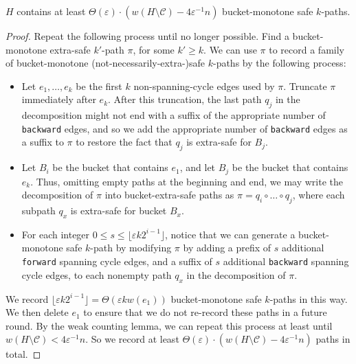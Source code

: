 \documentclass{theoretics}
\newcommand{\eps}{\varepsilon}
\newcommand{\cee}{\mathcal{C}}
\newcommand{\forward}{\texttt{forward}}
\newcommand{\backward}{\texttt{backward}}
\begin{document}
\begin{lemma} 
$H$ contains at least $\Theta(\eps) \cdot \left( w(H \setminus \cee) - 4 \eps^{-1} n \right)$ bucket-monotone safe $k$-paths.
\end{lemma}
\begin{proof}
Repeat the following process until no longer possible.
Find a bucket-monotone extra-safe $k'$-path $\pi$, for some $k' \ge k$.
We can use $\pi$ to record a family of bucket-monotone (not-necessarily-extra-)safe $k$-paths by the following process:
\begin{itemize}
\item Let $e_1, \dots, e_k$ be the first $k$ non-spanning-cycle edges used by $\pi$.
Truncate $\pi$ immediately after $e_k$.
After this truncation, the last path $q_j$ in the decomposition might not end with a suffix of the appropriate number of \backward{} edges, and so we add the appropriate number of \backward{} edges as a suffix to $\pi$ to restore the fact that $q_j$ is extra-safe for $B_j$.

\item Let $B_i$ be the bucket that contains $e_1$, and let $B_j$ be the bucket that contains $e_k$.
Thus, omitting empty paths at the beginning and end, we may write the decomposition of $\pi$ into bucket-extra-safe paths as $\pi = q_i \circ \dots \circ q_j$, where each subpath $q_x$ is extra-safe for bucket $B_x$.

\item For each integer $0 \le s \le \lfloor \eps k 2^{i-1} \rfloor$, notice that we can generate a bucket-monotone safe $k$-path by modifying $\pi$ by adding a prefix of $s$ additional \forward{} spanning cycle edges, and a suffix of $s$ additional \backward{} spanning cycle edges, to each nonempty path $q_x$ in the decomposition of $\pi$.
\end{itemize}

We record $\lfloor \eps k 2^{i-1} \rfloor = \Theta(\eps k w(e_1))$ bucket-monotone safe $k$-paths in this way.
We then delete $e_1$ to ensure that we do not re-record these paths in a future round.
By the weak counting lemma, we can repeat this process at least until $w(H \setminus \cee) < 4 \eps^{-1} n$.
So we record at least $\Theta(\eps) \cdot (w(H \setminus \cee) - 4 \eps^{-1} n)$ paths in total.
\end{proof}
\end{document}
